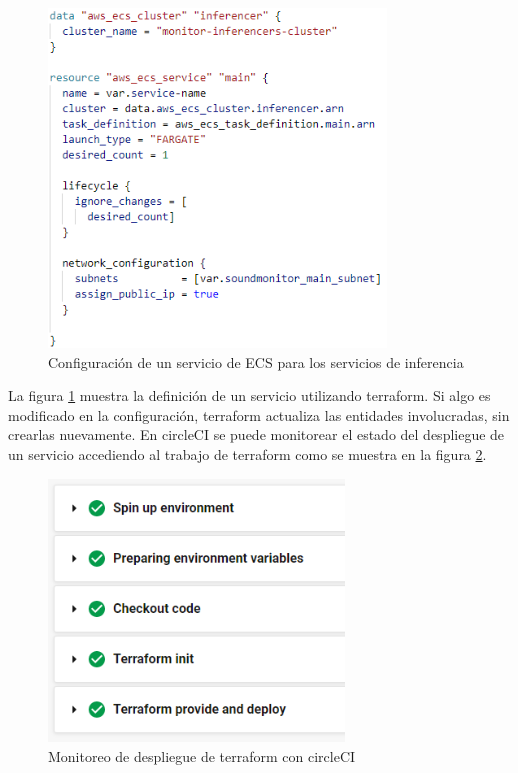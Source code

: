 \begin{figure}[H]
	\centering
	\includegraphics[width=0.8\textwidth]{bibliografia/Imagenes/infrastructure-providing.png}
	\caption{Configuración de un servicio de ECS para los servicios de inferencia}
	\label{ecsprovide}
\end{figure}

La figura \ref{ecsprovide} muestra la definición de un servicio utilizando terraform. Si algo es modificado en la configuración, terraform actualiza las entidades involucradas, sin crearlas nuevamente. En circleCI se puede monitorear el estado del despliegue de un servicio accediendo al trabajo de terraform como se muestra en la figura \ref{circleCITerraform}.

\begin{figure}[H]
	\centering
	\includegraphics[width=0.7\textwidth]{bibliografia/Imagenes/circleCITerraformJob.png}
	\caption{Monitoreo de despliegue de terraform con circleCI}
	\label{circleCITerraform}
\end{figure}

